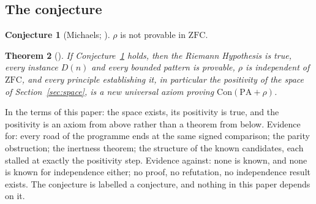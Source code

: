 \documentclass[11pt]{article}
\newtheorem{theorem}{Theorem}[section]
\theoremstyle{definition}
\newtheorem{conjecture}[theorem]{Conjecture}
\theoremstyle{remark}
\newcommand{\PA}{\mathrm{PA}}
\newcommand{\ZFC}{\mathrm{ZFC}}
\newcommand{\Con}{\mathrm{Con}}
\begin{document}
\subsection{The conjecture}
\begin{conjecture}[Michaels; {\cite[\S10]{gstring}}]\label{conj}
$\rho$ is not provable in $\ZFC$.
\end{conjecture}
\begin{theorem}[{\cite[Thm.\ 10.2]{gstring}}]
If Conjecture~\ref{conj} holds, then the Riemann Hypothesis is true, every instance $D(n)$ and every bounded pattern is provable, $\rho$ is independent of $\ZFC$, and every principle establishing it, in particular the positivity of the space of Section~\ref{sec:space}, is a new universal axiom proving $\Con(\PA+\rho)$.
\end{theorem}
In the terms of this paper: the space exists, its positivity is true, and the positivity is an axiom from above rather than a theorem from below. Evidence for: every road of the programme ends at the same signed comparison; the parity obstruction; the inertness theorem; the structure of the known candidates, each stalled at exactly the positivity step. Evidence against: none is known, and none is known for independence either; no proof, no refutation, no independence result exists. The conjecture is labelled a conjecture, and nothing in this paper depends on it.
\end{document}
